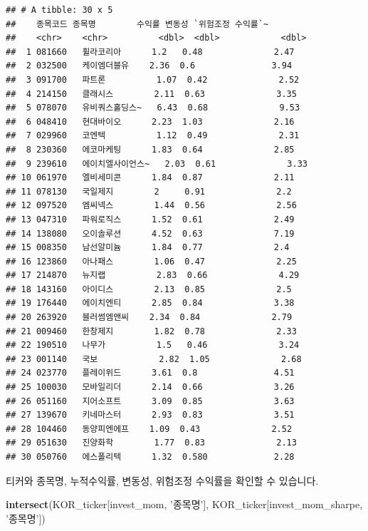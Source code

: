 \documentclass[12pt,]{book}
\newenvironment{Shaded}{\begin{snugshade}}{\end{snugshade}}
\newcommand{\KeywordTok}[1]{\textcolor[rgb]{0.13,0.29,0.53}{\textbf{#1}}}
\newcommand{\NormalTok}[1]{#1}
\newcommand{\StringTok}[1]{\textcolor[rgb]{0.31,0.60,0.02}{#1}}
\begin{document}
\begin{verbatim}
## # A tibble: 30 x 5
##    종목코드 종목명        수익률 변동성 `위험조정 수익률`~
##    <chr>    <chr>          <dbl>  <dbl>            <dbl>
##  1 081660   휠라코리아      1.2   0.48              2.47
##  2 032500   케이엠더블유    2.36  0.6               3.94
##  3 091700   파트론          1.07  0.42              2.52
##  4 214150   클래시스        2.11  0.63              3.35
##  5 078070   유비쿼스홀딩스~   6.43  0.68              9.53
##  6 048410   현대바이오      2.23  1.03              2.16
##  7 029960   코엔텍          1.12  0.49              2.31
##  8 230360   에코마케팅      1.83  0.64              2.85
##  9 239610   에이치엘사이언스~   2.03  0.61              3.33
## 10 061970   엘비세미콘      1.84  0.87              2.11
## 11 078130   국일제지        2     0.91              2.2 
## 12 097520   엠씨넥스        1.44  0.56              2.56
## 13 047310   파워로직스      1.52  0.61              2.49
## 14 138080   오이솔루션      4.52  0.63              7.19
## 15 008350   남선알미늄      1.84  0.77              2.4 
## 16 123860   아나패스        1.06  0.47              2.25
## 17 214870   뉴지랩          2.83  0.66              4.29
## 18 143160   아이디스        2.13  0.85              2.5 
## 19 176440   에이치엔티      2.85  0.84              3.38
## 20 263920   블러썸엠앤씨    2.34  0.84              2.79
## 21 009460   한창제지        1.82  0.78              2.33
## 22 190510   나무가          1.5   0.46              3.24
## 23 001140   국보            2.82  1.05              2.68
## 24 023770   플레이위드      3.61  0.8               4.51
## 25 100030   모바일리더      2.14  0.66              3.26
## 26 051160   지어소프트      3.09  0.85              3.63
## 27 139670   키네마스터      2.93  0.83              3.51
## 28 104460   동양피엔에프    1.09  0.43              2.52
## 29 051630   진양화학        1.77  0.83              2.13
## 30 050760   에스폴리텍      1.32  0.580             2.28
\end{verbatim}

티커와 종목명, 누적수익률, 변동성, 위험조정 수익률을 확인할 수 있습니다.

\begin{Shaded}
\begin{Highlighting}[]
\KeywordTok{intersect}\NormalTok{(KOR_ticker[invest_mom, }\StringTok{'종목명'}\NormalTok{],}
\NormalTok{          KOR_ticker[invest_mom_sharpe, }\StringTok{'종목명'}\NormalTok{])}
\end{Highlighting}
\end{Shaded}
\end{document}
